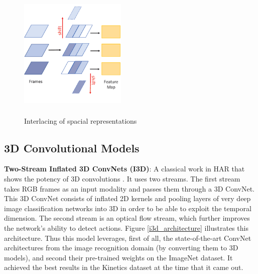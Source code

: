 \documentclass[extern,palatino]{cgMA}
\begin{document}
\begin{figure}[h]
\center
\includegraphics[height={180pt}, width={145pt}]{images/tin_block.png}
\caption{Interlacing of spacial representations \cite{shao2020temporal}}
\label{tin_block}
\end{figure}

\subsection{3D Convolutional Models}
\label{3d_convolutional_models}

\noindent\textbf{Two-Stream Inflated 3D ConvNets (I3D)}: A classical work in HAR that shows the potency of 3D convolutions \cite{carreira2017quo}. It uses two streams. The first stream takes RGB frames as an input modality and passes them through a 3D ConvNet. This 3D ConvNet consists of inflated 2D kernels and pooling layers of very deep image classification networks into 3D in order to be able to exploit the temporal dimension. The second stream is an optical flow stream, which further improves the network's ability to detect actions. Figure \ref{i3d_architecture} illustrates this architecture. Thus this model leverages, first of all, the state-of-the-art ConvNet architectures from the image recognition domain (by converting them to 3D models), and second their pre-trained weights on the ImageNet dataset. It achieved the best results in the Kinetics dataset at the time that it came out.
\end{document}
